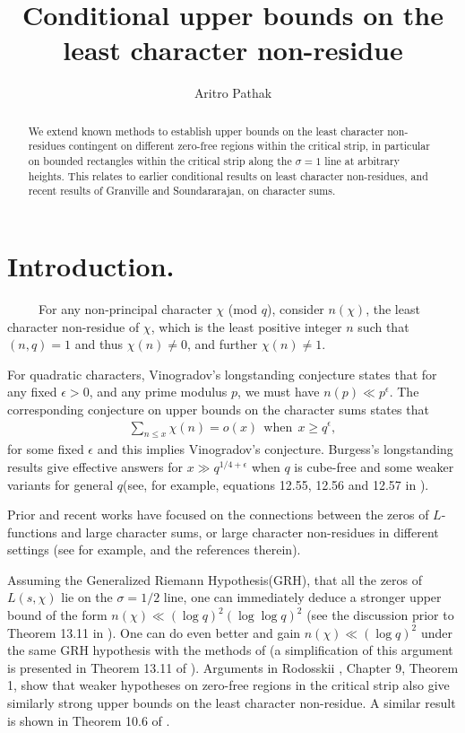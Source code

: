 \documentclass[letter,12pt]{article}
\title{Conditional upper bounds on the least character non-residue}
\author{Aritro Pathak}
\date{}
\newcounter{conj}
\theoremstyle{plain}
\theoremstyle{definition}
\theoremstyle{plain}
\newcommand{\eps}{\epsilon}
\begin{document}
\maketitle

\begin{abstract}
   We extend known methods to establish upper bounds on the least character non-residues contingent on different zero-free regions within the critical strip, in particular on bounded rectangles within the critical strip along the $\sigma=1$ line at arbitrary heights. This relates to earlier conditional results on least character non-residues, and recent results of Granville and Soundararajan, on character sums.
\end{abstract}

\section{Introduction.}
\ \ \ \ \ For any non-principal character $\chi$ (mod $q$), consider  $n(\chi)$, the least character non-residue of $\chi$, which is the least positive integer $n$ such that $(n,q)=1$ and thus $\chi(n)\neq 0$, and further $\chi(n)\neq 1$.

For quadratic characters, Vinogradov's longstanding conjecture states that for any fixed $\eps>0$, and any prime modulus $p$, we must have $n(p)\ll p^{\eps}$. The corresponding conjecture on upper bounds on the character sums states that
\begin{align}\label{eq:eq1}
\sum\limits_{n\leq x} \chi(n)=o(x) \ \ \text{when} \ \ x\geq q^{\eps},
\end{align}
for some fixed $\eps$ and this implies Vinogradov's conjecture. Burgess's longstanding results\cite{Bur1,Bur2} give effective answers for $x\gg q^{1/4+\eps}$ when $q$ is cube-free and some weaker variants for general $q$(see, for example, equations 12.55, 12.56 and 12.57 in \cite{IK}).

Prior and recent works have focused on the connections between the zeros of $L$-functions and large character sums, or large character non-residues in different settings (see for example, \cite{Pier,Mei} and the references therein).

Assuming the Generalized Riemann Hypothesis(GRH), that all the zeros of $L(s,\chi)$ lie on the $\sigma=1/2$ line, one can immediately deduce a stronger upper bound of the form $n(\chi)\ll (\log q)^{2}(\log \log q)^{2}$ (see the discussion prior to Theorem 13.11 in \cite{Mont}). One can do even better and gain $n(\chi)\ll (\log q)^{2}$ under the same GRH hypothesis with the methods of \cite{Ankeny}(a simplification of this argument is presented in Theorem 13.11 of \cite{Mont}). Arguments in Rodosskii \cite{Rodo}, \cite{Mont2} Chapter 9, Theorem 1, show that weaker hypotheses on zero-free regions in the critical strip also give similarly strong upper bounds on the least character non-residue.
A similar result is shown in Theorem 10.6 of \cite{BD}.
\end{document}
